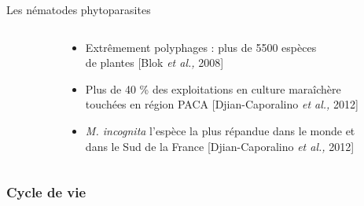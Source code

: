 \begin{frame}{Les nématodes phytoparasites}
\vspace{-0.5mm}

\begin{columns}
\hspace{1.7mm}
 \begin{column}{.3\textwidth}
 
          
 \end{column}
 \begin{column}{.8\textwidth}
 \hspace{-7mm}
            \begin{itemize}[leftmargin=-0.38cm]
           
\item<2>  Extrêmement polyphages : plus de 5500 espèces \\de plantes \textcolor{shadecolor}{{\small[Blok \textit{et al.,} 2008]}}  
\item<2> Plus de 40 \%  des exploitations en culture maraîchère \\ touchées en région PACA  \textcolor{shadecolor}{{\small[Djian-Caporalino \textit{et al.,} 2012]}}                  
\item<2> \textit{M. incognita}  l'espèce la plus répandue dans le monde et \\dans le Sud de la France \textcolor{shadecolor}{{\small[Djian-Caporalino \textit{et al.,} 2012]}}   
            \end{itemize}
 \end{column}
\end{columns}        
\end{frame}

\subsubsection{Cycle de vie}


